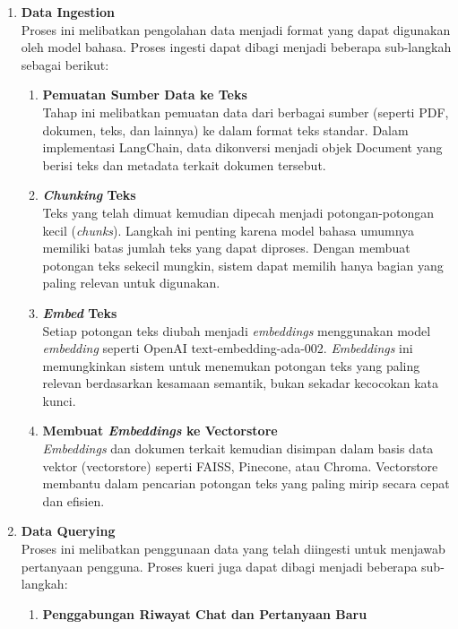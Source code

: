 \begin{enumerate}
	\item \textbf{Data Ingestion} \\
	      Proses ini melibatkan pengolahan data menjadi format yang dapat digunakan oleh model bahasa. Proses ingesti dapat dibagi menjadi beberapa sub-langkah sebagai berikut:
	      \begin{enumerate}
		      \item \textbf{Pemuatan Sumber Data ke Teks} \\
		            Tahap ini melibatkan pemuatan data dari berbagai sumber (seperti PDF, dokumen, teks, dan lainnya) ke dalam format teks standar. Dalam implementasi LangChain, data dikonversi menjadi objek Document yang berisi teks dan metadata terkait dokumen tersebut.
		      \item \textbf{\textit{Chunking} Teks} \\
		            Teks yang telah dimuat kemudian dipecah menjadi potongan-potongan kecil (\textit{chunks}). Langkah ini penting karena model bahasa umumnya memiliki batas jumlah teks yang dapat diproses. Dengan membuat potongan teks sekecil mungkin, sistem dapat memilih hanya bagian yang paling relevan untuk digunakan.
		      \item \textbf{\textit{Embed} Teks} \\
		            Setiap potongan teks diubah menjadi \textit{embeddings} menggunakan model \textit{embedding} seperti OpenAI text-embedding-ada-002. \textit{Embeddings} ini memungkinkan sistem untuk menemukan potongan teks yang paling relevan berdasarkan kesamaan semantik, bukan sekadar kecocokan kata kunci.
		      \item \textbf{Membuat \textit{Embeddings} ke Vectorstore} \\
		            \textit{Embeddings} dan dokumen terkait kemudian disimpan dalam basis data vektor (vectorstore) seperti FAISS, Pinecone, atau Chroma. Vectorstore membantu dalam pencarian potongan teks yang paling mirip secara cepat dan efisien.
	      \end{enumerate}
	\item \textbf{Data Querying} \\
	      Proses ini melibatkan penggunaan data yang telah diingesti untuk menjawab pertanyaan pengguna. Proses kueri juga dapat dibagi menjadi beberapa sub-langkah:
	      \begin{enumerate}
		      \item \textbf{Penggabungan Riwayat Chat dan Pertanyaan Baru} \\

\end{enumerate}
\end{enumerate}
